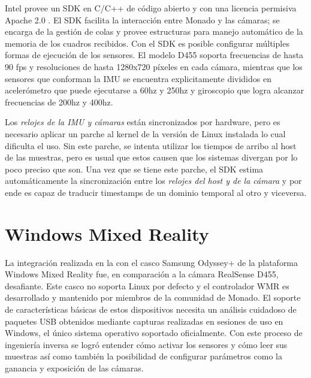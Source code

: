\documentclass[ twoside,openright,titlepage,numbers=noenddot,%
                headinclude,footinclude,cleardoublepage=empty,abstract=on,
                BCOR=-5mm,paper=a4,fontsize=11pt
                ]{scrreprt}
\begin{document}
Intel provee un SDK en C/C++ de código abierto y con una licencia
permisiva Apache 2.0 \autocite{ApacheLicenseVersion}. El SDK facilita la
interacción entre Monado y las cámaras; se encarga de la gestión de
colas y provee estructuras para manejo automático de la memoria de los
cuadros recibidos. Con el SDK es posible configurar múltiples formas de
ejecución de los sensores. El modelo D455 soporta frecuencias de hasta
90 fps y resoluciones de hasta 1280x720 píxeles en cada cámara, mientras
que los sensores que conforman la IMU se encuentra explicitamente
divididos en acelerómetro que puede ejecutarse a 60hz y 250hz y
giroscopio que logra alcanzar frecuencias de 200hz y 400hz.

Los \emph{relojes de la IMU y cámaras} están sincronizados por hardware,
pero es necesario aplicar un parche al kernel de la versión de Linux
instalada lo cual dificulta el uso. Sin este parche, se intenta utilizar
los tiempos de arribo al host de las muestras, pero es usual que estos
causen que los sistemas divergan por lo poco preciso que son. Una vez
que se tiene este parche, el SDK estima automáticamente la
sincronización entre los \emph{relojes del host y de la cámara} y por
ende es capaz de traducir timestamps de un dominio temporal al otro y
viceversa.

\hypertarget{windows-mixed-reality}{%
\section{Windows Mixed Reality}\label{windows-mixed-reality}}

La integración realizada en la  con el casco Samsung
Odyssey+ de la plataforma Windows Mixed Reality fue, en comparación a la
cámara RealSense D455, desafiante. Este casco no soporta Linux por
defecto y el controlador WMR es desarrollado y mantenido por miembros de
la comunidad de Monado. El soporte de características básicas de estos
dispositivos necesita un análisis cuidadoso de paquetes USB obtenidos
mediante capturas realizadas en sesiones de uso en Windows, el único
sistema operativo soportado oficialmente. Con este proceso de ingeniería
inversa se logró entender cómo activar los sensores y cómo leer sus
muestras así como también la posibilidad de configurar parámetros como
la ganancia y exposición de las cámaras.
\end{document}
